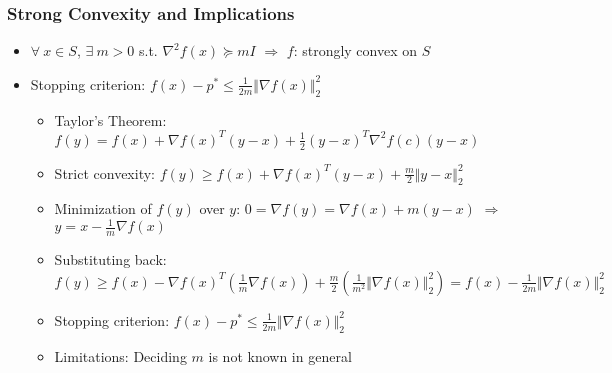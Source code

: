\subsubsection*{Strong Convexity and Implications}
\begin{itemize}
    \item $\forall~x\in S$, $\exists~m>0$ s.t. $\nabla^2 f(x)\succeq mI$ $\Rightarrow$ $f$: strongly convex on $S$
    \item Stopping criterion: $f(x)-p^\ast\leq\frac{1}{2m}\Vert\nabla f(x)\Vert_2^2$
    \begin{itemize}
        \item Taylor's Theorem: $f(y)=f(x)+\nabla f(x)^T(y-x)+\frac{1}{2}(y-x)^T\nabla^2f(c)(y-x)$
        \item Strict convexity: $f(y)\geq f(x)+\nabla f(x)^T(y-x)+\frac{m}{2}\Vert y-x\Vert_2^2$
        \item Minimization of $f(y)$ over $y$: $0=\nabla f(y)=\nabla f(x)+m(y-x)$ $\Rightarrow$ $y=x-\frac{1}{m}\nabla f(x)$
        \item Substituting back: $f(y)\geq f(x)-\nabla f(x)^T\left(\frac{1}{m}\nabla f(x)\right)+\frac{m}{2}\left(\frac{1}{m^2}\Vert\nabla f(x)\Vert_2^2\right)=f(x)-\frac{1}{2m}\Vert\nabla f(x)\Vert_2^2$
        \item Stopping criterion: $f(x)-p^\ast\leq\frac{1}{2m}\Vert\nabla f(x)\Vert_2^2$
        \item Limitations: Deciding $m$ is not known in general
    \end{itemize}
\end{itemize}


